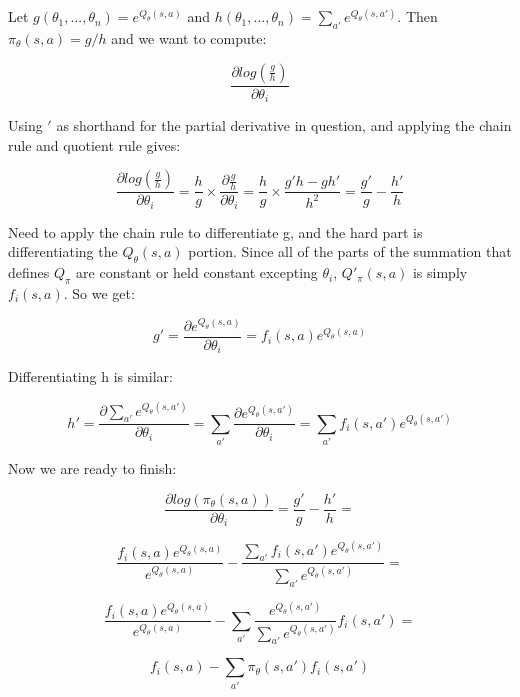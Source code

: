 \documentclass{article}
\begin{document}
\section{}
Let $g(\theta_1,...,\theta_n) = e^{Q_{\theta}(s,a)}$ and $h(\theta_1,...,
\theta_n) = \sum_{a'} e^{Q_{\theta}(s,a')}$. Then $\pi_{\theta}(s,a) = g/h$
and we want to compute:

\[
\frac{\partial log(\frac{g}{h})}{\partial \theta_i}
\]

Using $'$ as shorthand for the partial derivative in question, and applying the
chain rule and quotient rule gives:

\[
\frac{\partial log(\frac{g}{h})}{\partial \theta_i} = 
\frac{h}{g} \times \frac{\partial \frac{g}{h}}{\partial \theta_i} = 
\frac{h}{g} \times \frac{g'h-gh'}{h^2} = \frac{g'}{g} - \frac{h'}{h}
\]

Need to apply the chain rule to differentiate g, and the hard part is
differentiating the $Q_\theta(s,a)$ portion. Since all of the parts of the 
summation that
defines $Q_{\pi}$ are constant or held constant excepting $\theta_i$, 
$Q'_{\pi}(s,a)$ is simply $f_i(s,a)$. So we get:

\[
g' = \frac{\partial e^{Q_{\theta}(s,a)}}{\partial \theta_i} =
f_i(s,a) e^{Q_{\theta}(s,a)}
\]

Differentiating h is similar:

\[
h' = \frac{\partial \sum_{a'}e^{Q_{\theta}(s,a')}}{\partial \theta_i} = 
\sum_{a'} \frac{\partial e^{Q_{\theta}(s,a')}}{\partial \theta_i} =
\sum_{a'} f_i(s,a') e^{Q_{\theta}(s,a')}
\]

Now we are ready to finish:

\[
\frac{\partial log(\pi_{\theta}(s,a))}{\partial \theta_i} = 
\frac{g'}{g} - \frac{h'}{h} =
\]

\vspace{6pt}

\[
\frac{f_i(s,a) e^{Q_{\theta}(s,a)}}{e^{Q_{\theta}(s,a)}} - 
\frac{\sum_{a'} f_i(s,a') e^{Q_{\theta}(s,a')}}{\sum_{a'} e^{Q_{\theta}(s,a')}}
=
\]

\vspace{6pt}

\[
\frac{f_i(s,a) e^{Q_{\theta}(s,a)}}{e^{Q_{\theta}(s,a)}} - 
\sum_{a'} \frac{e^{Q_{\theta}(s,a')}}{\sum_{a'} e^{Q_{\theta}(s,a')}} f_i(s,a') 
= 
\]

\vspace{6pt}

\[
f_i(s,a) - \sum_{a'}\pi_{\theta}(s,a')f_i(s,a')
\]
\end{document}
